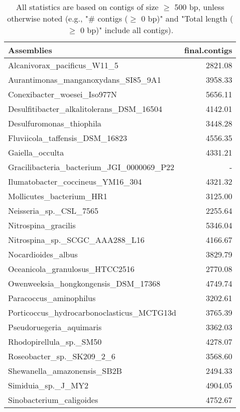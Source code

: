 \documentclass[12pt,a4paper]{article}
\begin{document}
\begin{table}[ht]
\begin{center}
\caption{All statistics are based on contigs of size $\geq$ 500 bp, unless otherwise noted (e.g., "\# contigs ($\geq$ 0 bp)" and "Total length ($\geq$ 0 bp)" include all contigs).}
\begin{tabular}{|l*{1}{|r}|}
\hline
Assemblies & final.contigs \\ \hline
Alcanivorax\_pacificus\_W11\_5 & 2821.08 \\ \hline
Aurantimonas\_manganoxydans\_SI85\_9A1 & 3958.33 \\ \hline
Conexibacter\_woesei\_Iso977N & 5656.11 \\ \hline
Desulfitibacter\_alkalitolerans\_DSM\_16504 & 4142.01 \\ \hline
Desulfuromonas\_thiophila & 3448.28 \\ \hline
Fluviicola\_taffensis\_DSM\_16823 & 4556.35 \\ \hline
Gaiella\_occulta & 4331.21 \\ \hline
Gracilibacteria\_bacterium\_JGI\_0000069\_P22 & - \\ \hline
Ilumatobacter\_coccineus\_YM16\_304 & 4321.32 \\ \hline
Mollicutes\_bacterium\_HR1 & 3125.00 \\ \hline
Neisseria\_sp.\_CSL\_7565 & 2255.64 \\ \hline
Nitrospina\_gracilis & 5346.04 \\ \hline
Nitrospina\_sp.\_SCGC\_AAA288\_L16 & 4166.67 \\ \hline
Nocardioides\_albus & 3829.79 \\ \hline
Oceanicola\_granulosus\_HTCC2516 & 2770.08 \\ \hline
Owenweeksia\_hongkongensis\_DSM\_17368 & 4749.74 \\ \hline
Paracoccus\_aminophilus & 3202.61 \\ \hline
Porticoccus\_hydrocarbonoclasticus\_MCTG13d & 3765.39 \\ \hline
Pseudoruegeria\_aquimaris & 3362.03 \\ \hline
Rhodopirellula\_sp.\_SM50 & 4278.07 \\ \hline
Roseobacter\_sp.\_SK209\_2\_6 & 3568.60 \\ \hline
Shewanella\_amazonensis\_SB2B & 2494.33 \\ \hline
Simiduia\_sp.\_J\_MY2 & 4904.05 \\ \hline
Sinobacterium\_caligoides & 4752.67 \\ \hline

\end{tabular}
\end{center}
\end{table}
\end{document}
